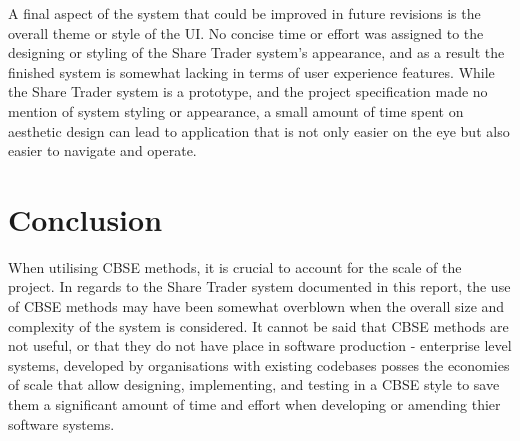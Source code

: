 \documentclass[12pt, a4paper,titlepage]{article}
\begin{document}
A final aspect of the system that could be improved in future revisions is the
overall theme or style of the UI.
No concise time or effort was assigned to the designing or styling of the
Share Trader system's appearance, and as a result the finished system is
somewhat lacking in terms of user experience features.
While the Share Trader system is a prototype, and the project specification
made no mention of system styling or appearance, a small amount of time spent
on aesthetic design can lead to application that is not only easier on the eye
but also easier to navigate and operate.

\section{Conclusion}
When utilising CBSE methods, it is crucial to account for the scale of the
project.  
In regards to the Share Trader system documented in this report, the use of
CBSE methods may have been somewhat overblown when the overall size and
complexity of the system is considered.  
It cannot be said that CBSE methods are not useful, or that they do not have
place in software production - enterprise level systems, developed by
organisations with existing codebases posses the economies of scale that allow
designing, implementing, and testing in a CBSE style to save them a
significant amount of time and effort when developing or amending thier software
systems. 


\clearpage




\appendix
\end{document}

